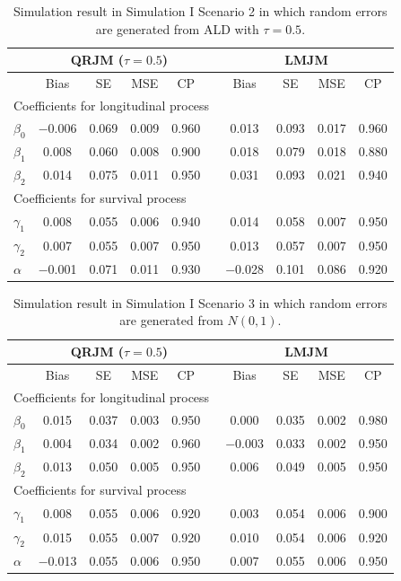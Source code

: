 \documentclass[12pt]{article}
\begin{document}
\begin{table}[H]
\centering
\caption{Simulation result in Simulation I Scenario 2 in which random errors are generated from ALD with $\tau=0.5$.}
\label{tab:sim1tab2}
\begin{tabular}{lccccccccc}
\hline
& \multicolumn{4}{c}{QRJM ($\tau=0.5$)} & & \multicolumn{4}{c}{LMJM}\\
\hline
 & Bias & SE & MSE & CP & & Bias & SE & MSE & CP \\
\hline
  \multicolumn{10}{l}{Coefficients for longitudinal process} \\
  $\beta_0$ & $-$0.006 & 0.069 & 0.009 & 0.960 & & 0.013 & 0.093 & 0.017 & 0.960 \\
  $\beta_{1}$ & 0.008 & 0.060 & 0.008 & 0.900 & & 0.018 & 0.079 & 0.018 & 0.880 \\
  $\beta_{2}$ & 0.014 & 0.075 & 0.011 & 0.950 & & 0.031 & 0.093 & 0.021 & 0.940 \\
  \multicolumn{10}{l}{Coefficients for survival process} \\
  $\gamma_1$ & 0.008 & 0.055 & 0.006 & 0.940 & & 0.014 & 0.058 & 0.007 & 0.950 \\
  $\gamma_2$ & 0.007 & 0.055 & 0.007 & 0.950 & & 0.013 & 0.057 & 0.007 & 0.950 \\
  $\alpha$ & $-$0.001 & 0.071 & 0.011 & 0.930 & & $-$0.028 & 0.101 & 0.086 & 0.920 \\
   \hline
\end{tabular}
\end{table}

\begin{table}[H]
\centering
\caption{Simulation result in Simulation I Scenario 3 in which random errors are generated from $N(0, 1)$.}
\label{tab:sim1tab3}
\begin{tabular}{lccccccccc}
\hline
& \multicolumn{4}{c}{QRJM ($\tau=0.5$)} & & \multicolumn{4}{c}{LMJM} \\
\hline
 & Bias & SE & MSE & CP & & Bias & SE & MSE & CP \\
\hline
  \multicolumn{10}{l}{Coefficients for longitudinal process} \\

  $\beta_0$ & 0.015 & 0.037 & 0.003 & 0.950 & & 0.000 & 0.035 & 0.002 & 0.980 \\
  $\beta_{1}$ & 0.004 & 0.034 & 0.002 & 0.960 & & $-$0.003 & 0.033 & 0.002 & 0.950\\
  $\beta_{2}$ & 0.013 & 0.050 & 0.005 & 0.950 & & 0.006 & 0.049 & 0.005 & 0.950 \\
  \multicolumn{10}{l}{Coefficients for survival process} \\
  $\gamma_1$ & 0.008 & 0.055 & 0.006 & 0.920 & & 0.003 & 0.054 & 0.006 & 0.900 \\
  $\gamma_2$ & 0.015 & 0.055 & 0.007 & 0.920 & & 0.010 & 0.054 & 0.006 & 0.920 \\
  $\alpha$ & $-$0.013 & 0.055 & 0.006 & 0.950 & & 0.007 & 0.055 & 0.006 & 0.950 \\
   \hline
\end{tabular}
\end{table}
\end{document}
